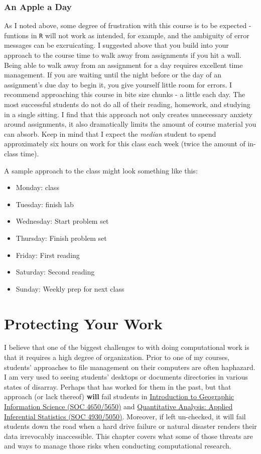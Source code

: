 \documentclass[]{book}
\providecommand{\tightlist}{%
  \setlength{\itemsep}{0pt}\setlength{\parskip}{0pt}}
\theoremstyle{definition}
\theoremstyle{definition}
\theoremstyle{definition}
\theoremstyle{remark}
\begin{document}
\subsection{An Apple a Day}\label{an-apple-a-day}

As I noted above, some degree of frustration with this course is to be
expected - funtions in \texttt{R} will not work as intended, for
example, and the ambiguity of error messages can be excruicating. I
suggested above that you build into your approach to the course time to
walk away from assignments if you hit a wall. Being able to walk away
from an assignment for a day requires excellent time management. If you
are waiting until the night before or the day of an assignment's due day
to begin it, you give yourself little room for errors. I recommend
approaching this course in bite size chunks - a little each day. The
most successful students do not do all of their reading, homework, and
studying in a single sitting. I find that this approach not only creates
unnecessary anxiety around assignments, it also dramatically limits the
amount of course material you can absorb. Keep in mind that I expect the
\emph{median} student to spend approximately six hours on work for this
class each week (twice the amount of in-class time).

A sample approach to the class might look something like this:

\begin{itemize}
\tightlist
\item
  Monday: class
\item
  Tuesday: finish lab
\item
  Wednesday: Start problem set
\item
  Thursday: Finish problem set
\item
  Friday: First reading
\item
  Saturday: Second reading
\item
  Sunday: Weekly prep for next class
\end{itemize}

\chapter{Protecting Your Work}\label{protecting-your-work}

I believe that one of the biggest challenges to with doing computational
work is that it requires a high degree of organization. Prior to one of
my courses, students' approaches to file management on their computers
are often haphazard. I am very used to seeing students' desktops or
documents directories in various states of disarray. Perhaps that has
worked for them in the past, but that approach (or lack thereof)
\textbf{will} fail students in
\href{https://slu-soc5650.github.io}{Introduction to Geographic
Information Science (SOC 4650/5650)} and
\href{https://slu-soc5050.github.io}{Quantitative Analysis: Applied
Inferential Statistics (SOC 4930/5050)}. Moreover, if left un-checked,
it will fail students down the road when a hard drive failure or natural
disaster renders their data irrevocably inaccessible. This chapter
covers what some of those threats are and ways to manage those risks
when conducting computational research.
\end{document}
